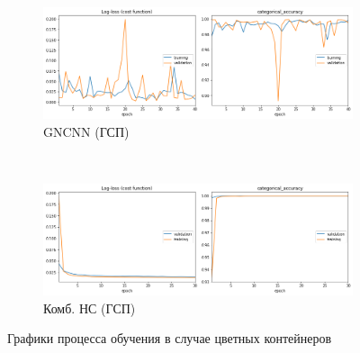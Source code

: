 \begin{figure}[p]
    \centering

    \begin{subfigure}{\textwidth}
        \includegraphics[width=\textwidth]{include/graphics/experimental_plots/color/gncnn_hic}
                            \caption{GNCNN (ГСП)}
    \end{subfigure}
    ~
    \begin{subfigure}{\textwidth}
        \includegraphics[width=\textwidth]{include/graphics/experimental_plots/color/mixed_hic}
                            \caption{Комб. НС (ГСП)}
    \end{subfigure}

    \caption{Графики процесса обучения в случае цветных контейнеров}
    \label{fig:ColorPlotsHIC}
\end{figure}

